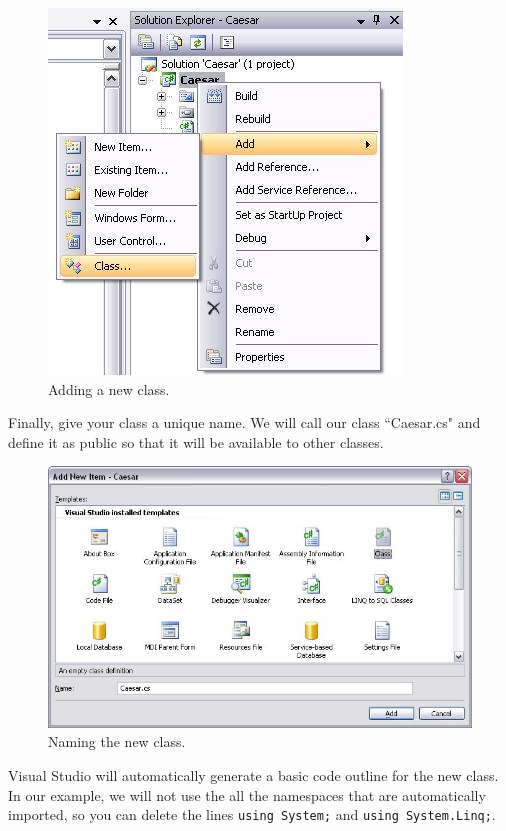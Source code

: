 \begin{figure}[h]
	\centering
		\includegraphics{figures/add_new_class.jpg}
	\caption{Adding a new class.}
	\label{fig:add_new_class}
\end{figure}
\clearpage

\noindent Finally, give your class a unique name. We will call our class ``Caesar.cs" and define it as public so that it will be available to other classes.

\begin{figure}[h!]
	\centering
		\includegraphics[width=1.00\textwidth]{figures/name_new_class.jpg}
	\caption{Naming the new class.}
	\label{fig:name_new_class}
\end{figure}

\noindent Visual Studio will automatically generate a basic code outline for the new class. In our example, we will not use the all the namespaces that are automatically imported, so you can delete the lines \texttt{using System;} and \texttt{using System.Linq;}.

